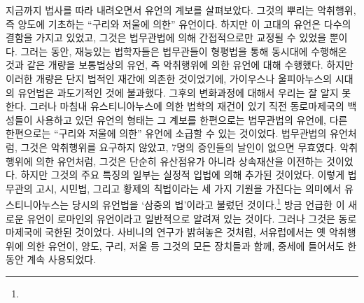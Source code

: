 지금까지 법사를 따라 내려오면서 유언의 계보를 살펴보았다.
그것의 뿌리는 악취행위, 즉 양도에 기초하는 ``구리와 저울에 의한'' 유언이다.
하지만 이 고대의 유언은 다수의 결함을 가지고 있었고,
그것은 법무관법에 의해 간접적으로만 교정될 수 있었을 뿐이다.
그러는 동안, 재능있는 법학자들은
법무관들이 형평법을 통해 동시대에 수행해온 것과 같은 개량을
보통법상의 유언, 즉 악취행위에 의한 유언에 대해 수행했다.
하지만 이러한 개량은 단지 법적인 재간에 의존한 것이었기에,
가이우스나 울피아누스의 시대의 유언법은 과도기적인 것에 불과했다.
그후의 변화과정에 대해서 우리는 잘 알지 못한다.
그러나 마침내 유스티니아누스에 의한 법학의 재건이 있기 직전
동로마제국의 백성들이 사용하고 있던 유언의 형태는
그 계보를 한편으로는 법무관법의 유언에,
다른 한편으로는 ``구리와 저울에 의한'' 유언에 소급할 수 있는
것이었다.
법무관법의 유언처럼, 그것은 악취행위를 요구하지 않았고,
7명의 증인들의 날인이 없으면 무효였다.
악취행위에 의한 유언처럼, 그것은 단순히 유산점유가 아니라
상속재산을 이전하는 것이었다.
하지만 그것의 주요 특징의 일부는 실정적 입법에 의해 추가된 것이었다.
이렇게 법무관의 고시, 시민법, 그리고 황제의 칙법이라는
세 가지 기원을 가진다는 의미에서
유스티니아누스는 당시의 유언법을
`삼중의 법'이라고 불렀던 것이다.\footnote{}
방금 언급한 이 새로운 유언이
로마인의 유언이라고
일반적으로
알려져 있는 것이다.
그러나 그것은 동로마제국에 국한된 것이었다.
사비니의 연구가 밝혀놓은 것처럼,
서유럽에서는 옛 악취행위에 의한 유언이,
양도, 구리, 저울 등 그것의 모든 장치들과 함께,
중세에 들어서도 한동안 계속 사용되었다.

